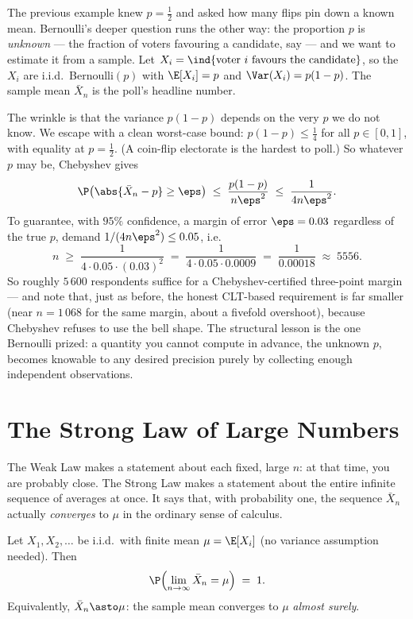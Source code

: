The previous example knew $p=\tfrac12$ and asked how many flips pin down a known mean. Bernoulli's deeper question runs the other way: the proportion $p$ is \emph{unknown} --- the fraction of voters favouring a candidate, say --- and we want to estimate it from a sample. Let $X_i = \ind\{\text{voter } i \text{ favours the candidate}\}$, so the $X_i$ are i.i.d.\ Bernoulli$(p)$ with $\E[X_i]=p$ and $\Var(X_i)=p(1-p)$. The sample mean $\bar X_n$ is the poll's headline number.

The wrinkle is that the variance $p(1-p)$ depends on the very $p$ we do not know. We escape with a clean worst-case bound: $p(1-p) \le \tfrac14$ for all $p\in[0,1]$, with equality at $p=\tfrac12$. (A coin-flip electorate is the hardest to poll.) So whatever $p$ may be, Chebyshev gives
\[
  \P\bigl(\abs{\bar X_n - p} \ge \eps\bigr) \;\le\; \frac{p(1-p)}{n\eps^2} \;\le\; \frac{1}{4n\eps^2}.
\]
To guarantee, with $95\%$ confidence, a margin of error $\eps = 0.03$ regardless of the true $p$, demand $1/(4n\eps^2) \le 0.05$, i.e.
\[
  n \;\ge\; \frac{1}{4\cdot 0.05 \cdot (0.03)^2} \;=\; \frac{1}{4\cdot 0.05\cdot 0.0009} \;=\; \frac{1}{0.00018} \;\approx\; 5556.
\]
So roughly $5\,600$ respondents suffice for a Chebyshev-certified three-point margin --- and note that, just as before, the honest CLT-based requirement is far smaller (near $n=1\,068$ for the same margin, about a fivefold overshoot), because Chebyshev refuses to use the bell shape. The structural lesson is the one Bernoulli prized: a quantity you cannot compute in advance, the unknown $p$, becomes knowable to any desired precision purely by collecting enough independent observations.

\section{The Strong Law of Large Numbers}
\label{ch20:slln}

The Weak Law makes a statement about each fixed, large $n$: at that time, you are probably close. The Strong Law makes a statement about the entire infinite sequence of averages at once. It says that, with probability one, the sequence $\bar X_n$ actually \emph{converges} to $\mu$ in the ordinary sense of calculus.

\begin{theorem}
\label{ch20:thm-slln}
Let $X_1, X_2, \dots$ be i.i.d.\ with finite mean $\mu = \E[X_i]$ (no variance assumption needed). Then
\[
  \P\Bigl(\lim_{n\to\infty} \bar X_n = \mu\Bigr) \;=\; 1.
\]
Equivalently, $\bar X_n \asto \mu$: the sample mean converges to $\mu$ \emph{almost surely}.
\end{theorem}

